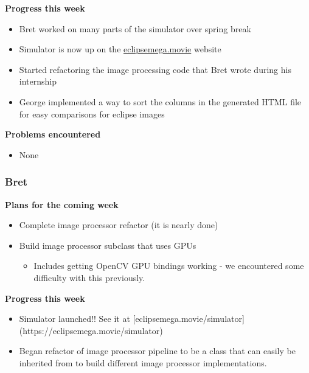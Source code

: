 \documentclass[10pt, onecolumn, draftclsnofoot, letterpaper, compsoc]{IEEEtran}
\begin{document}
    \noindent \textbf{Progress this week}

    \begin{itemize}

    \item Bret worked on many parts of the simulator over spring break
    \item Simulator is now up on the \href{https://eclipsemega.movie}{eclipsemega.movie} website
    \item Started refactoring the image processing code that Bret wrote during his internship
    \item George implemented a way to sort the columns in the generated HTML file for easy comparisons for eclipse images

    \end{itemize}

    \noindent \textbf{Problems encountered}

    \begin{itemize}

    \item None

    \end{itemize}

    \subsubsection{Bret}

    \noindent \textbf{Plans for the coming week}

    \begin{itemize}

    \item Complete image processor refactor (it is nearly done)
    \item Build image processor subclass that uses GPUs

    \begin{itemize}
      \item Includes getting OpenCV GPU bindings working - we encountered some difficulty with this previously.
    \end{itemize}

    \end{itemize}

    \noindent \textbf{Progress this week}

    \begin{itemize}

    \item Simulator launched!! See it at [eclipsemega.movie/simulator](https://eclipsemega.movie/simulator)
    \item Began refactor of image processor pipeline to be a class that can easily be inherited from to build different image processor implementations.

    \end{itemize}
\end{document}
